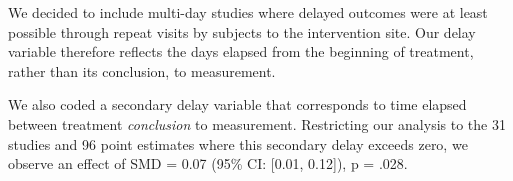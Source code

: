 \documentclass[sn-nature,referee,pdflatex]{sn-jnl}
\begin{document}
We decided to include multi-day studies where delayed outcomes were at
least possible through repeat visits by subjects to the intervention
site. Our delay variable therefore reflects the days elapsed from the
beginning of treatment, rather than its conclusion, to measurement.

We also coded a secondary delay variable that corresponds to time
elapsed between treatment \emph{conclusion} to measurement. Restricting
our analysis to the 31 studies and 96 point estimates where this
secondary delay exceeds zero, we observe an effect of SMD = 0.07 (95\%
CI: {[}0.01, 0.12{]}), p = .028.


\end{document}
